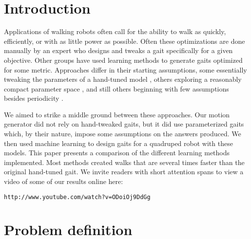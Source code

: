 \section{Introduction}


Applications of walking robots often call for the ability to walk as
quickly, efficiently, or with as little power as possible.  Often
these optimizations are done manually by an expert who designs and
tweaks a gait specifically for a given objective.  Other groups have
used learning methods to generate gaits optimized for some metric.
Approaches differ in their starting assumptions, some essentially
tweaking the parameters of a hand-tuned model \cite{chernova}, others
exploring a reasonably compact parameter space \cite{kohl}, and still
others beginning with few assumptions besides periodicity
\cite{zykov}.

We aimed to strike a middle ground between these approaches.  Our
motion generator did not rely on hand-tweaked gaits, but it did use
parameterized gaits which, by their nature, impose some assumptions on
the answers produced.  We then used machine learning to design gaits
for a quadruped robot with these models.  This paper presents a
comparison of the different learning methods implemented.  Most
methods created walks that are several times faster than the original
hand-tuned gait.  We invite readers with short attention spans to view
a video of some of our results online here:

\texttt{http://www.youtube.com/watch?v=ODoiOj9DdGg}




\section{Problem definition}

